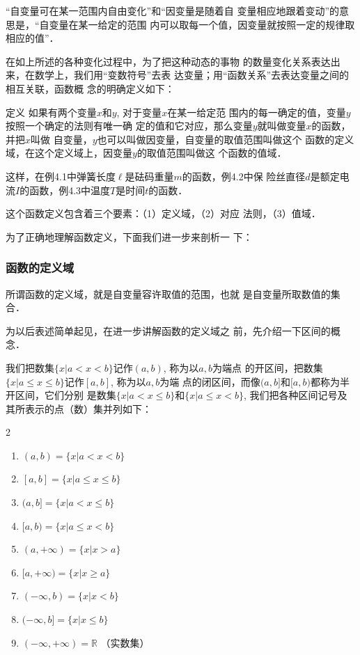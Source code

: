“自变量可在某一范围内自由变化”和“因变量是随着自
变量相应地跟着变动”的意思是，“自变量在某一给定的范围
内可以取每一个值，因变量就按照一定的规律取相应的值”．

在如上所述的各种变化过程中，为了把这种动态的事物
的数量变化关系表达出来，在数学上，我们用“变数符号”去表
达变量；用“函数关系”去表达变量之间的相互关联，函数概
念的明确定义如下：

\begin{blk}{定义 }
    如果有两个变量$x$和$y$, 对于变量$x$在某一给定范
围内的每一确定的值，变量$y$按照一个确定的法则有唯一确
定的值和它对应，那么变量$y$就叫做变量$x$的函数，并把$x$叫做
自变量，$y$也可以叫做因变量，自变量的取值范围叫做这个
函数的定义域，在这个定义域上，因变量$y$的取值范围叫做这
个函数的值域．
\end{blk}


这样，在例4.1中弹簧长度$\ell$是砝码重量$m$的函数，例4.2中保
险丝直径$d$是额定电流$I$的函数，例4.3中温度$T$是时间$t$的函数．

这个函数定义包含着三个要素：（1）定义域，（2）对应
法则，（3）值域．

为了正确地理解函数定义，下面我们进一步来剖析一
下：

\subsubsection{函数的定义域}
所谓函数的定义域，就是自变量容许取值的范围，也就
是自变量所取数值的集合．

为以后表述简单起见，在进一步讲解函数的定义域之
前，先介绍一下区间的概念．

我们把数集$\{x|a<x<b\}$记作$(a,b)$, 称为以$a,b$为端点
的开区间，把数集$\{x|a\le x\le b\}$记作$[a,b]$, 称为以$a,b$为端
点的闭区间，而像$(a,b]$和$[a,b)$都称为半开区间，它们分别
是数集$\{x|a<x\le b\}$和$\{x|a\le x<b\}$, 我们把各种区间记号及
其所表示的点（数）集并列如下：
\begin{multicols}{2}
    \begin{enumerate}
    \item $(a,b)=\{x|a<x<b\}$
    \item $ [a,b]=\{x|a\le x\le b\}$
    \item $(a,b]=\{x|a<x\le b\}$
    \item $[a,b)=\{x|a\le x<b\}$
    \item $(a,+\infty)=\{x|x>a\}$
    \item $[a,+\infty)=\{x|x\ge a\}$
    \item $(-\infty,b)=\{x|x<b\}$
    \item $(-\infty,b]=\{x|x\le b\}$
    \item $(-\infty,+\infty)=\mathbb{R}$ （实数集）
\end{enumerate}
\end{multicols}

